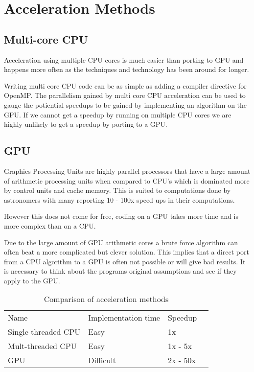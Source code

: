\documentclass[prodmode,acmtecs]{acmsmall} \usepackage[ruled]{algorithm2e}
\begin{document}
\section{Acceleration Methods}
    \subsection{Multi-core CPU}
    Acceleration using multiple CPU cores is much easier than porting to GPU and happens more often as the techniques
    and technology has been around for longer. {\cite{fluke2011astrophysical}
    Writing multi core CPU code can be as simple as adding a compiler directive for OpenMP.
    The parallelism gained by multi core CPU acceleration can be used to gauge the potiential speedups
    to be gained by implementing an algorithm on the GPU. If we cannot get a speedup by running
    on multiple CPU cores we are highly unlikely to get a speedup by porting to a GPU. 
    
        \cite{westerlund2014framework}
        \cite{scott}

    \subsection{GPU}
Graphics Processing Units are highly parallel processors that have a large amount of
arithmetic processing units when compared to CPU's which is dominated more by control units
and cache memory. This is suited to computations done by astronomers with many reporting 
10 - 100x speed ups in their computations. \cite{hassan2011unleashing}

However this does not come for free, coding on a GPU takes more time and is more complex than on a CPU. 

Due to the large amount of GPU arithmetic cores a brute force algorithm can often beat
a more complicated but clever solution.  \cite{fluke2011astrophysical} This implies that a direct port from
a CPU algorithm to a GPU is often not possible or will give bad results. It is necessary to think about the programs original
assumptions and see if they apply to the GPU. 

    \cite{laidler2013detection}
    
\begin{table}[h!]

    \begin{tabular}{ |l|l|l|l| }
    \hline
    Name & Implementation time & Speedup \\
    Single threaded CPU & Easy & 1x \\
    Mult-threaded CPU & Easy & 1x - 5x  \\
    GPU & Difficult & 2x - 50x  \\
    \end{tabular}
    \caption{Comparison of acceleration methods}
\end{table}

}
\end{document}
